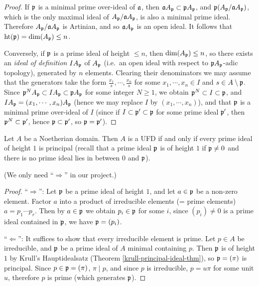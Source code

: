 \begin{proof}
\leanok
If ${\mathfrak{p}}$ is a minimal prime over-ideal of ${\mathfrak{a}}$, then ${\mathfrak{a}} A_{\mathfrak{p}}\subset{\mathfrak{p}} A_{\mathfrak{p}}$,
and ${\mathfrak{p}}(A_{\mathfrak{p}}/{\mathfrak{a}} A_{\mathfrak{p}})$, which is the only maximal ideal of
$A_{\mathfrak{p}}/{\mathfrak{a}} A_{\mathfrak{p}}$, is also a minimal prime ideal.
Therefore $A_{\mathfrak{p}}/{\mathfrak{a}} A_{\mathfrak{p}}$ is Artinian, and so
${\mathfrak{a}} A_{\mathfrak{p}}$ is an open ideal. It follows that ${\mathrm{ht}}({\mathfrak{p}})=\dim(A_{\mathfrak{p}})\leq n$.

Conversely, if ${\mathfrak{p}}$ is a prime ideal of height $\leq n$,
then $\dim(A_{\mathfrak{p}})\leq n$, so there exists an \emph{ideal of definition}
$IA_{\mathfrak{p}}$ of $A_{\mathfrak{p}}$
(i.e.~an open ideal with respect to ${\mathfrak{p}} A_{\mathfrak{p}}$-adic topology),
generated by $n$ elements.
Clearing their denominators we may assume that the generators take the form
$\frac{x_1}s,\cdots,\frac{x_n}s$ for some $x_1,\cdots,x_n\in I$
and $s\in A\setminus{\mathfrak{p}}$.
Since ${\mathfrak{p}}^NA_{\mathfrak{p}}\subset IA_{\mathfrak{p}}\subset{\mathfrak{p}} A_{\mathfrak{p}}$ for some integer $N\geq 1$,
we obtain ${\mathfrak{p}}^N\subset I\subset{\mathfrak{p}}$, and
$IA_{\mathfrak{p}}=(x_1,\cdots,x_n)A_{\mathfrak{p}}$
(hence we may replace $I$ by $(x_1,\cdots,x_n)$), and that ${\mathfrak{p}}$ is a minimal prime over-ideal of $I$
(since if $I\subset{\mathfrak{p}}'\subset{\mathfrak{p}}$ for some prime ideal ${\mathfrak{p}}'$,
then ${\mathfrak{p}}^N\subset{\mathfrak{p}}'$, hence ${\mathfrak{p}}\subset{\mathfrak{p}}'$, so ${\mathfrak{p}}={\mathfrak{p}}'$).
\end{proof}

\begin{thm}
\label{UFD-iff-ht-1-principal}
\leanok
Let $A$ be a Noetherian domain. Then $A$ is a UFD if and only if every prime ideal of height $1$ is principal
(recall that a prime ideal ${\mathfrak{p}}$ is of height $1$ if ${\mathfrak{p}} \neq 0$ and there is no prime ideal lies in between $0$ and ${\mathfrak{p}}$).

(We only need ``$\Rightarrow$'' in our project.)
\end{thm}

\begin{proof}
\leanok
``$\Rightarrow$'':
Let ${\mathfrak{p}}$ be a prime ideal of height $1$,
and let $a\in{\mathfrak{p}}$ be a non-zero element.
Factor $a$ into a product of irreducible elements
(= prime elements) $a=p_1\cdots p_r$.
Then by $a\in{\mathfrak{p}}$ we obtain $p_i\in{\mathfrak{p}}$ for some $i$,
since $(p_i)\neq 0$ is a prime ideal contained in ${\mathfrak{p}}$, we have ${\mathfrak{p}}=(p_i)$.

``$\Leftarrow$'':
It suffices to show that every irreducible element is prime.
Let $p\in A$ be irreducible, and ${\mathfrak{p}}$ be a prime ideal of $A$ minimal containing $p$.
Then ${\mathfrak{p}}$ is of height $1$ by Krull's Hauptidealsatz
(Theorem \ref{krull-principal-ideal-thm}),
so ${\mathfrak{p}}=(\pi)$ is principal.
Since $p\in{\mathfrak{p}}=(\pi)$, $\pi\mid p$, and since $p$ is irreducible,
$p=u\pi$ for some unit $u$, therefore $p$ is prime (which generates ${\mathfrak{p}}$).
\end{proof}

